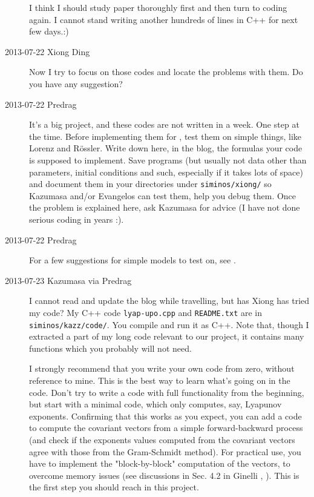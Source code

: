 \begin{description}
I think I should study paper  thoroughly first and then turn to coding again. I
cannot stand writing another hundreds of lines in C++ for next few days.:)

\item[2013-07-22 Xiong Ding]
Now I try to focus on those codes and locate the problems with them.
Do you have any suggestion?

\item[2013-07-22 Predrag] It's a big project, and these codes are not written
in a week. One step at the time. Before implementing them for \KS,
test them on simple things, like Lorenz and R\"ossler. Write down here,
in the blog, the
formulas your code is supposed to implement. Save programs
(but usually not data other than parameters, initial conditions and such,
especially if it takes lots of space)
and document them in your
directories under \texttt{siminos/xiong/} so Kazumasa and/or Evangelos
can test them, help you debug them. Once the problem is explained
here, ask Kazumasa for advice (I have not done serious coding in years :).

\item[2013-07-22 Predrag] For a few suggestions for simple models to
test on, see .

\item[2013-07-23 Kazumasa via Predrag]
I cannot read and update the blog while travelling, but has Xiong has
tried my code? My C++  code \texttt{lyap-upo.cpp} and \texttt{README.txt}
are in \texttt{siminos/kazz/code/}. You compile and run it as C++. Note
that, though I extracted a part of my long code relevant to our project,
it contains many functions which you probably will not need.

I strongly recommend that you write your own code from zero, without
reference to mine. This is the best way to learn what's going on in
the code. Don't try to write a code with full functionality from the
beginning, but start with a minimal code, which only computes, say,
Lyapunov exponents.
Confirming that this works as you expect, you can add a code to compute
the covariant vectors from a simple forward-backward process (and
check if the exponents values computed from the covariant vectors
agree with those from the Gram-Schmidt method). For practical use,
you have to implement the "block-by-block" computation of the
vectors, to overcome memory issues (see discussions in Sec. 4.2 in
Ginelli \etal{}, ). This is
the first step you should reach in this project.


\end{description}
